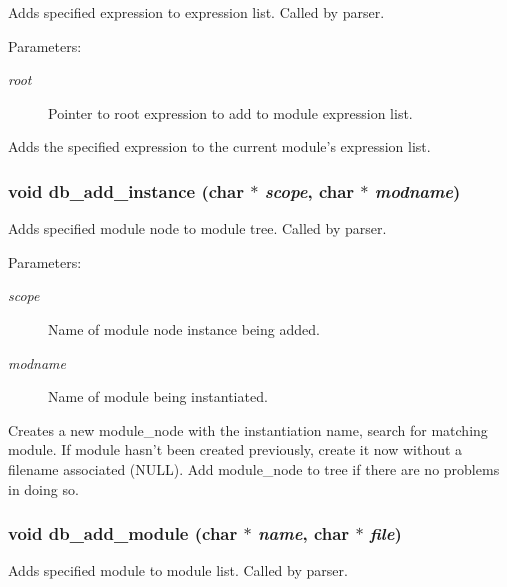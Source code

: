 Adds specified expression to expression list. Called by parser.

\begin{Desc}
\item[Parameters: ]\par
\begin{description}
\item[{\em 
root}]Pointer to root expression to add to module expression list.\end{description}
\end{Desc}
Adds the specified expression to the current module's expression list. 
\subsubsection{\setlength{\rightskip}{0pt plus 5cm}void db\_\-add\_\-instance (char $\ast$ {\em scope}, char $\ast$ {\em modname})}\label{db_8c_a15}


Adds specified module node to module tree. Called by parser.

\begin{Desc}
\item[Parameters: ]\par
\begin{description}
\item[{\em 
scope}]Name of module node instance being added. \item[{\em 
modname}]Name of module being instantiated.\end{description}
\end{Desc}
Creates a new module\_\-node with the instantiation name, search for matching module. If module hasn't been created previously, create it now without a filename associated (NULL). Add module\_\-node to tree if there are no problems in doing so. 
\subsubsection{\setlength{\rightskip}{0pt plus 5cm}void db\_\-add\_\-module (char $\ast$ {\em name}, char $\ast$ {\em file})}\label{db_8c_a16}


Adds specified module to module list. Called by parser.

